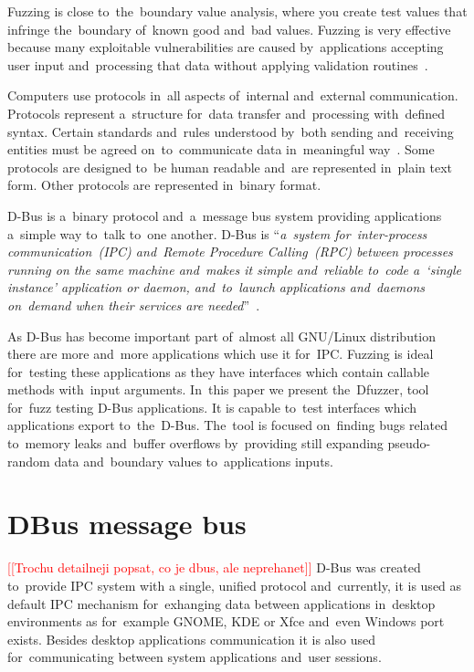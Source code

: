 \documentclass[conference]{IEEEtran}
\newcommand{\addtodo}[1]{\textcolor{red}{[[#1]]}}
\begin{document}
Fuzzing is close to~the~boundary value analysis, where you create test values that
infringe the~boundary of~known good and~bad values. Fuzzing is very effective
because many exploitable vulnerabilities are caused by~applications accepting
user input and~processing that data without applying validation
routines~\cite{Fuzzing}.

Computers use protocols in~all aspects of~internal and~external communication.
Protocols represent a~structure for~data transfer and~processing with~defined
syntax. Certain standards and~rules understood by~both sending and~receiving
entities must be agreed on~to~communicate data in~meaningful way~\cite{Fuzzing}.
Some protocols are designed to~be human readable and~are represented in~plain
text form. Other protocols are represented in~binary format.

D-Bus is a~binary protocol and~a~message bus system providing applications
a~simple way to~talk to~one another. D-Bus is ``\emph{a~system for~\mbox{inter-process}
communication~(IPC) and~Remote Procedure Calling~(RPC) between
processes running on the same machine and~makes it simple and~reliable to~code
a~`single instance' application or daemon, and~to~launch applications and~daemons
on~demand when their services are needed}''~\cite{DBUS}.

As D-Bus has become important part of~almost all GNU/Linux distribution there
are more and~more applications which use it for~IPC. Fuzzing is ideal for~testing
these applications as they have interfaces which contain callable methods
with~input arguments. In~this paper we present the~Dfuzzer, tool for~fuzz
testing D-Bus applications. It is capable to~test interfaces which applications
export to~the~D-Bus. The~tool is focused on~finding bugs related to~memory leaks
and~buffer overflows by~providing still expanding pseudo-random data and~boundary
values to~applications inputs.

\section{DBus message bus}
\addtodo{Trochu detailneji popsat, co je dbus, ale neprehanet}
D-Bus was created to~provide IPC system with a single, unified protocol
and~currently, it is used as default IPC mechanism for~exhanging data between
applications in~desktop environments as for~example GNOME, KDE or Xfce and~even
Windows port exists. Besides desktop applications communication it is also used
for~communicating between system applications and~user sessions.
\end{document}

